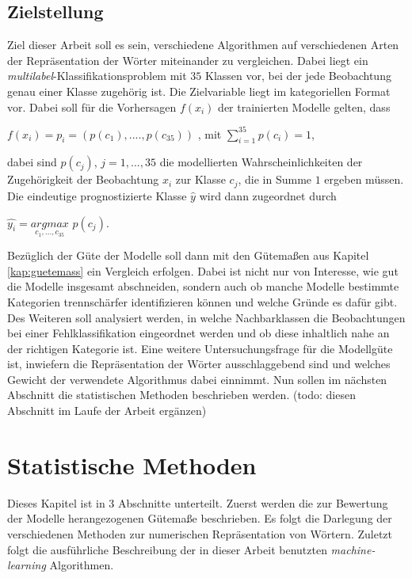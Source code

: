 \documentclass[a4paper,11pt]{article}
\begin{document}
\subsection{Zielstellung} \label{Kap:Zielst}

Ziel dieser Arbeit soll es sein, verschiedene Algorithmen auf verschiedenen Arten der Repräsentation der Wörter miteinander zu vergleichen. Dabei liegt ein \textit{multilabel}-Klassifikations\-problem mit $35$ Klassen vor, bei der jede Beobachtung genau einer Klasse zugehörig ist. Die Zielvariable liegt im kategoriellen Format vor. Dabei soll für die Vorhersagen $f(x_i)$ der trainierten Modelle gelten, dass
\begin{center}
$f(x_i) = p_i = (p(c_1), ...., p(c_{35}))$ \hspace{2cm} , mit $\sum\limits_{i = 1}^{35} p(c_i) = 1 $,
\end{center}
dabei sind $p(c_j)$, $j = 1,...,35$ die modellierten Wahrscheinlichkeiten der Zugehörigkeit der Beobachtung $x_i$ zur Klasse $c_j$, die in Summe $1$ ergeben müssen. Die eindeutige prognostizierte Klasse $\hat{y}$ wird dann zugeordnet durch 
\begin{center}
    $\hat{y_i} =  \underset{c_1,...,c_{35}}{argmax}$ $p(c_j)$.
\end{center}

Bezüglich der Güte der Modelle soll dann mit den Gütemaßen aus Kapitel \ref{kap:guetemass} ein Vergleich erfolgen. Dabei ist nicht nur von Interesse, wie gut die Modelle insgesamt abschneiden, sondern auch ob manche Modelle bestimmte Kategorien trennschärfer identifizieren können und welche Gründe es dafür gibt. Des Weiteren soll analysiert werden, in welche Nachbarklassen die Beobachtungen bei einer Fehlklassifikation eingeordnet werden und ob diese inhaltlich nahe an der richtigen Kategorie ist. Eine weitere Untersuchungsfrage für die Modellgüte ist, inwiefern die Repräsentation der Wörter ausschlaggebend sind und welches Gewicht der verwendete Algorithmus dabei einnimmt.
Nun sollen im nächsten Abschnitt die statistischen Methoden beschrieben werden.
(todo: diesen Abschnitt im Laufe der Arbeit ergänzen)

\newpage

\section{Statistische Methoden}

Dieses Kapitel ist in $3$ Abschnitte unterteilt. Zuerst werden die zur Bewertung der Modelle herangezogenen Gütemaße beschrieben. Es folgt die Darlegung der verschiedenen Methoden zur numerischen Repräsentation von Wörtern. Zuletzt folgt die ausführliche Beschreibung der in dieser Arbeit benutzten \textit{machine-learning} Algorithmen.
\end{document}
